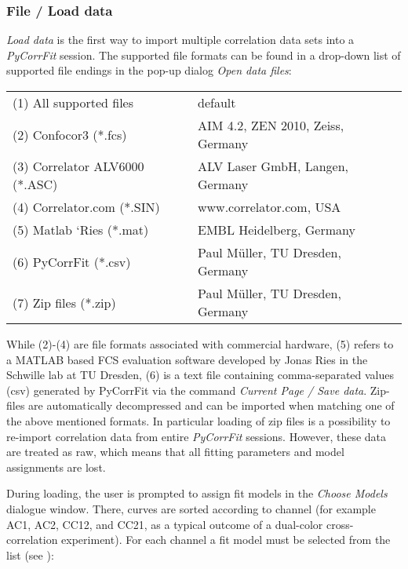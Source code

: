 \subsubsection{File / Load data}
\label{sec:menub.filem.loadd}
\textit{Load data }is the first way to import multiple correlation data sets into a \textit{PyCorrFit} session. The supported file formats can be found in a drop-down list of supported file endings in the pop-up dialog \textit{Open data files}:


\begin{tabular}{l l}
 \rule{0pt}{3ex}  (1) All supported files & default \\
 \rule{0pt}{3ex} (2) Confocor3 (*.fcs) & AIM 4.2, ZEN 2010, Zeiss, Germany \\
 \rule{0pt}{3ex} (3) Correlator ALV6000 (*.ASC) & ALV Laser GmbH, Langen, Germany \\
 \rule{0pt}{3ex} (4) Correlator.com (*.SIN) & www.correlator.com, USA \\
 \rule{0pt}{3ex} (5) Matlab ‘Ries (*.mat) & EMBL Heidelberg, Germany \\
 \rule{0pt}{3ex} (6) PyCorrFit (*.csv) & Paul Müller, TU Dresden, Germany \\
 \rule{0pt}{3ex} (7) Zip files (*.zip) & Paul Müller, TU Dresden, Germany \\
\end{tabular}
\vspace{3ex}
\newline
While (2)-(4) are file formats associated with commercial hardware, (5) refers to a MATLAB based FCS evaluation software developed by Jonas Ries in the Schwille lab at TU Dresden, (6) is a text file containing comma-separated values (csv) generated by PyCorrFit via the command \textit{Current Page / Save data}. Zip-files are automatically decompressed and can be imported when matching one of the above mentioned formats. In particular loading of zip files is a possibility to re-import correlation data from entire \textit{PyCorrFit} sessions. However, these data are treated as raw, which means that all fitting parameters and model assignments are lost.

During loading, the user is prompted to assign fit models in the \textit{Choose Models} dialogue window. There, curves are sorted according to channel (for example AC1, AC2, CC12, and CC21, as a typical outcome of a dual-color cross-correlation experiment). For each channel a fit model must be selected from the list (see ):

